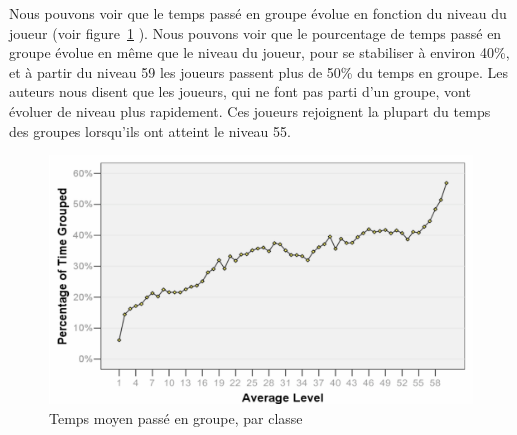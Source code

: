 \documentclass[10pt,twocolumn]{article}
\begin{document}
\par Nous pouvons voir que le temps passé en groupe évolue en fonction du niveau du joueur (voir figure~\ref{timespentgroup} ). Nous pouvons voir que le pourcentage de temps passé en groupe évolue en même que le niveau du joueur, pour se stabiliser à environ 40\%, et à partir du niveau 59 les joueurs passent plus de 50\% du temps en groupe. Les auteurs nous disent que les joueurs, qui ne font pas parti d'un groupe, vont évoluer de niveau plus rapidement. Ces joueurs rejoignent la plupart du temps des groupes lorsqu'ils ont atteint le niveau 55. 
	\begin{figure}[!h]
        \centering
        \includegraphics[scale=0.75]{./images/timespentgroup.png}
        \caption{Temps moyen passé en groupe, par classe}
        \label{timespentgroup}
        \end{figure}
\end{document}
